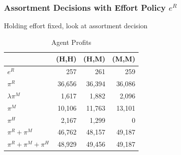 \begin{frame}
\frametitle{Assortment Decisions with Effort Policy $e^R$}
Holding effort fixed, look at assortment decision
\begin{table}[htp]
\caption{Agent Profits}
\begin{center}
\begin{tabular}{|l| rrr|}
\hline
 & (H,H) & (H,M) & (M,M) \\
 \hline
$e^{R}$ & 257 & 261 & 259 \\ \hline
$\pi^R$ & 36,656 & 36,394 & 36,086 \\
$\lambda \pi^M$ & 1,617 & 1,882  & 2,096\\
$\pi^M$ & 10,106 & 11,763 & 13,101 \\
$\pi^H$ & 2,167 & 1,299 & 0 \\
$\pi^{R} +\pi^{M}$ & 46,762 & 48,157 & 49,187 \\
$\pi^R + \pi^M + \pi^H$ & 48,929 & 49,456 & 49,187 \\ \hline
\end{tabular}
\end{center}
\label{tab:assortmentonly}
\end{table}
\end{frame}

